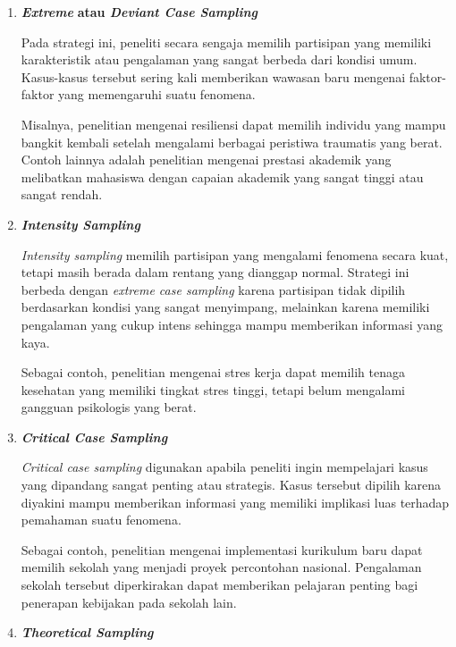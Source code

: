 \documentclass[
  indonesian,
  letterpaper,
  DIV=11,
  numbers=noendperiod]{scrreprt}
\begin{document}
\begin{enumerate}
  \emph{Typical case sampling} digunakan apabila peneliti ingin memahami
  kondisi yang dianggap umum atau lazim terjadi pada suatu populasi.
  Oleh karena itu, partisipan dipilih karena dianggap mewakili
  karakteristik yang paling sering ditemukan, bukan karena memiliki
  pengalaman yang unik atau ekstrem.

  Sebagai contoh, penelitian mengenai pengalaman belajar mahasiswa tahun
  pertama dapat memilih mahasiswa dengan prestasi akademik, latar
  belakang sosial, dan aktivitas yang mencerminkan kondisi mayoritas
  mahasiswa pada program studi tersebut.
\item
  \textbf{\emph{Extreme}} \textbf{atau \emph{Deviant Case Sampling}}

  Pada strategi ini, peneliti secara sengaja memilih partisipan yang
  memiliki karakteristik atau pengalaman yang sangat berbeda dari
  kondisi umum. Kasus-kasus tersebut sering kali memberikan wawasan baru
  mengenai faktor-faktor yang memengaruhi suatu fenomena.

  Misalnya, penelitian mengenai resiliensi dapat memilih individu yang
  mampu bangkit kembali setelah mengalami berbagai peristiwa traumatis
  yang berat. Contoh lainnya adalah penelitian mengenai prestasi
  akademik yang melibatkan mahasiswa dengan capaian akademik yang sangat
  tinggi atau sangat rendah.
\item
  \textbf{\emph{Intensity Sampling}}

  \emph{Intensity sampling} memilih partisipan yang mengalami fenomena
  secara kuat, tetapi masih berada dalam rentang yang dianggap normal.
  Strategi ini berbeda dengan \emph{extreme case sampling} karena
  partisipan tidak dipilih berdasarkan kondisi yang sangat menyimpang,
  melainkan karena memiliki pengalaman yang cukup intens sehingga mampu
  memberikan informasi yang kaya.

  Sebagai contoh, penelitian mengenai stres kerja dapat memilih tenaga
  kesehatan yang memiliki tingkat stres tinggi, tetapi belum mengalami
  gangguan psikologis yang berat.
\item
  \textbf{\emph{Critical Case Sampling}}

  \emph{Critical case sampling} digunakan apabila peneliti ingin
  mempelajari kasus yang dipandang sangat penting atau strategis. Kasus
  tersebut dipilih karena diyakini mampu memberikan informasi yang
  memiliki implikasi luas terhadap pemahaman suatu fenomena.

  Sebagai contoh, penelitian mengenai implementasi kurikulum baru dapat
  memilih sekolah yang menjadi proyek percontohan nasional. Pengalaman
  sekolah tersebut diperkirakan dapat memberikan pelajaran penting bagi
  penerapan kebijakan pada sekolah lain.
\item
  \textbf{\emph{Theoretical Sampling}}


\end{enumerate}
\end{document}
